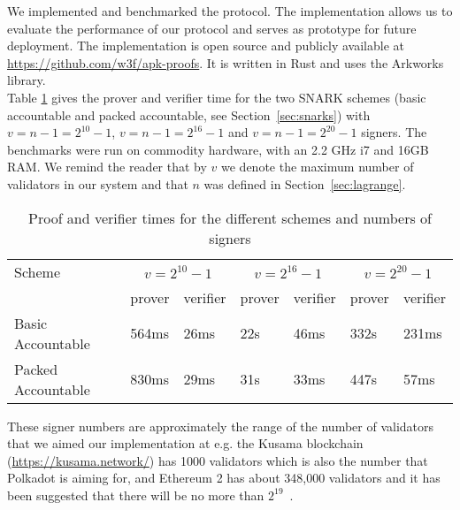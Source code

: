 \noindent We implemented and benchmarked the protocol. The implementation allows us to evaluate the performance of our protocol and serves as prototype for future deployment. The implementation 
is open source and publicly available at \url{https://github.com/w3f/apk-proofs}. It is written in Rust and uses the Arkworks library. \\

\noindent Table \ref{tab:benchmarks} gives the prover and verifier time for the two SNARK schemes (basic accountable and packed accountable, see Section~\ref{sec:snarks}) with $v = n-1 = 2^{10}-1$, $v = n-1 = 2^{16}-1$ 
and $v=n-1=2^{20}-1$ signers. The benchmarks were run on commodity hardware, with an 2.2 GHz i7 and 16GB RAM. We remind the reader that by $v$ we denote the maximum number of  validators in our system and that $n$ was defined in Section~\ref{sec:lagrange}.\\

\begin{table}[h!]
\hfill
\begin{tabular}{| l | l | l | l | l |l | l |}
\hline
 Scheme & \multicolumn{2}{|c|}{$v = 2^{10}-1$} & \multicolumn{2}{|c|}{$v = 2^{16}-1$} & \multicolumn{2}{|c|}{$v = 2^{20}-1$}     \\
\cline{2-7}
 &  prover & verifier & prover & verifier &  prover & verifier \\
\hline
Basic Accountable & 564ms & 26ms & 22s & 46ms & 332s & 231ms \\
Packed Accountable & 830ms & 29ms & 31s & 33ms & 447s & 57ms \\
\hline
\end{tabular}
\caption{Proof and verifier times for the different schemes and numbers of signers}
\label{tab:benchmarks}
\end{table}

\noindent These signer numbers are approximately the range of the number of validators that we aimed our implementation at e.g. the Kusama blockchain (\url{https://kusama.network/}) has 1000 validators which is also the number that Polkadot is aiming for, and Ethereum 2 has about 348,000 validators and it has been suggested that there will be no more than $2^{19}$~\cite{ethresearch1}. \\

